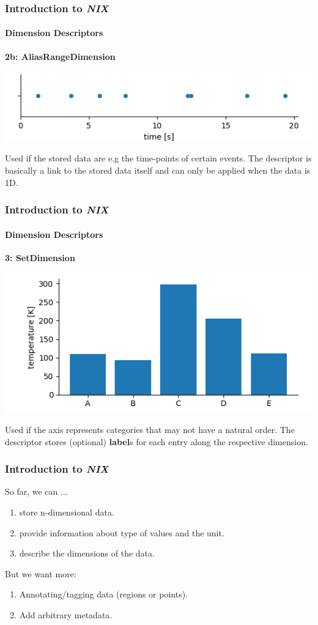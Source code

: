 \documentclass[pdftex, xcolor=table]{beamer}
\newcommand{\nix}{\textit{NIX}}
\begin{document}
\begin{frame}
  \frametitle{Introduction to \nix{}}
  \framesubtitle{Dimension Descriptors}
  \noindent \textbf{2b: AliasRangeDimension}
  \begin{center}
    \includegraphics[width=0.85\linewidth]{images/alias_range.png}
  \end{center}
  \pause Used if the stored data are e.g the time-points of certain
  events.  The descriptor is basically a link to the stored data
  itself and can only be applied when the data is 1D.
\end{frame}


\begin{frame}
  \frametitle{Introduction to \nix{}}
  \framesubtitle{Dimension Descriptors}
  \noindent \textbf{3: SetDimension}

  \begin{center}
    \includegraphics[width=0.85\linewidth]{images/set_dimension.png}
  \end{center}
  \pause

  Used if the axis represents categories that may not have a natural
  order.  The descriptor stores (optional) \textbf{label}s for each
  entry along the respective dimension.
\end{frame}

\begin{frame}
  \frametitle{Introduction to \nix{}}

  So far, we can ...
  \begin{enumerate}
    \item store n-dimensional data.
    \item provide information about type of values and the unit.
    \item describe the dimensions of the data.
  \end{enumerate}
  \pause
  But we want more:
  \begin{enumerate}
  \item Annotating/tagging data (regions or points).
  \item Add arbitrary metadata.
  \end{enumerate}
\end{frame}
\end{document}
